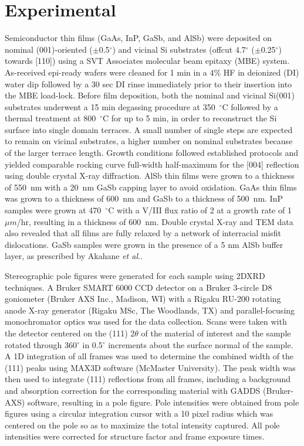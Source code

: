 \section{Experimental} 
Semiconductor thin films (GaAs, InP, GaSb, and AlSb) were deposited on nominal 
(001)-oriented (\(\pm\)0.5\(^\circ\)) and vicinal Si substrates (offcut 
4.7\(^\circ\) (\(\pm\)0.25\(^\circ\)) towards [110]) using a SVT Associates 
molecular beam epitaxy (MBE) system. As-received epi-ready wafers were cleaned 
for 1 min in a 4\% HF in deionized (DI) water dip followed by a 30 sec DI 
rinse immediately prior to their insertion into the MBE load-lock. Before film 
deposition, both the nominal and vicinal Si(001) substrates underwent a 15 min 
degassing procedure at 350~\(^\circ\)C followed by a thermal treatment at 
800~\(^\circ\)C for up to 5 min, in order to reconstruct the Si surface into 
single domain 
terraces\cite{NeergaardWaltenburg1995,S1991,Sakamoto1986,Pehlke1991}. A small 
number of single steps are expected to remain on vicinal substrates, a higher 
number on nominal substrates because of the larger terrace length. Growth 
conditions followed established 
protocols\cite{Akahane2004,Balakrishnan2006a,Fischer1986} and yielded 
comparable rocking curve full-width half-maximum for the [004] reflection 
using double crystal X-ray diffraction. AlSb thin films were grown to a 
thickness of 550~nm with a 20~nm GaSb capping layer to avoid oxidation. GaAs 
thin films was grown to a thickness of 600~nm and GaSb to a thickness of 
500~nm. InP samples were grown at 470~\(^\circ\)C with a V/III flux ratio of 2 
at a growth rate of 1 \(\mu m\)/hr, resulting in a thickness of 600~nm. Double 
crystal X-ray and TEM data also revealed that all films are fully relaxed by a 
network of interracial misfit dislocations\cite{Vajargah2011}. GaSb samples 
were grown in the presence of a 5 nm AlSb buffer layer, as prescribed by 
Akahane \textit{et al}.\cite{Akahane2004}.

Stereographic pole figures were generated for each sample using 2DXRD 
techniques. A Bruker SMART 6000 CCD detector on a Bruker 3-circle D8 
goniometer (Bruker AXS Inc., Madison, WI) with a Rigaku RU-200 rotating anode 
X-ray generator (Rigaku MSc, The Woodlands, TX) and parallel-focusing 
monochromator optics was used for the data collection. Scans were taken with 
the detector centered on the (111) 2\(\theta\) of the material of interest and 
the sample rotated through 360\(^\circ\) in 0.5\(^\circ\) increments about the 
surface normal of the sample. A 1D integration of all frames was used to 
determine the combined width of the (111) peaks using MAX3D software (McMaster 
University)\cite{Britten2007}. The peak width was then used to integrate (111) 
reflections from all frames, including a background and absorption correction 
for the corresponding material with GADDS (Bruker-AXS) software, resulting in 
a pole figure. Pole intensities were obtained from pole figures using a 
circular integration cursor with a 10 pixel radius which was centered on the 
pole so as to maximize the total intensity captured. All pole intensities were 
corrected for structure factor and frame exposure times.

